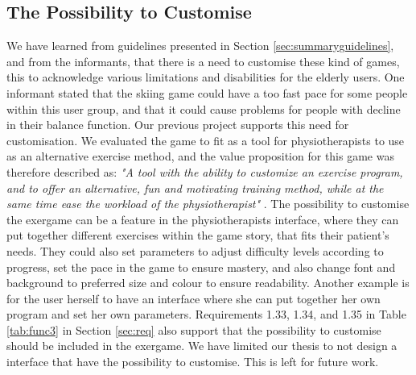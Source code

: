 \subsection{The Possibility to Customise}
We have learned from guidelines presented in Section \ref{sec:summaryguidelines}, and from the informants, that there is a need to customise these kind of games, this to acknowledge various limitations and disabilities for the elderly users. One informant stated that the skiing game could have a too fast pace for some people within this user group, and that it could cause problems for people with decline in their balance function. Our previous project \cite{project} supports this need for customisation. We evaluated the game to fit as a tool for physiotherapists to use as an alternative exercise method, and the value proposition for this game was therefore described as: \emph{"A tool with the ability to customize an exercise program, and to offer an alternative, fun and motivating training method, while at the same time ease the workload of the physiotherapist"} \cite{project}. The possibility to customise the exergame can be a feature in the physiotherapists interface, where they can put together different exercises within the game story, that fits their patient's needs. They could also set parameters to adjust difficulty levels according to progress, set the pace in the game to ensure mastery, and also change font and background to preferred size and colour to ensure readability. Another example is for the user herself to have an interface where she can put together her own program and set her own parameters. Requirements 1.33, 1.34, and 1.35 in Table \ref{tab:func3} in Section \ref{sec:req} also support that the possibility to customise should be included in the exergame. We have limited our thesis to not design a interface that have the possibility to customise. This is left for future work. 

